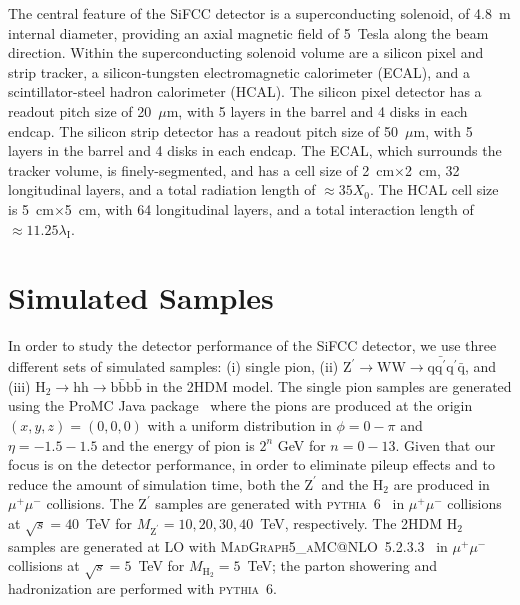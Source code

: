\documentclass{PoS}
\makeatletter
\newcommand{\PYTHIA} {{\textsc{pythia}}}
\newcommand{\MADGRAPHAMC} {\textsc{MadGraph5\_aMC@NLO}}
\makeatother
\begin{document}
The central feature of the SiFCC detector is a superconducting solenoid, 
of 4.8~m internal diameter, providing an axial magnetic field of 5~Tesla 
along the beam direction. Within the superconducting solenoid volume are 
a silicon pixel and strip tracker, a silicon-tungsten electromagnetic 
calorimeter (ECAL), and a scintillator-steel hadron calorimeter (HCAL). 
The silicon pixel detector has a readout pitch size of 20~$\mu$m, with
5 layers in the barrel and 4 disks in each endcap. 
The silicon strip detector has a readout pitch size of 50~$\mu$m, with 5 
layers in the barrel and 4 disks in each endcap.
 The ECAL, which surrounds the tracker volume, is finely-segmented, and 
 has a cell size of 2~cm$\times$2~cm, 32 longitudinal layers, and a 
total radiation length of $\approx 35 X_0$. The HCAL cell size is 
5~cm$\times$5~cm, with 64 longitudinal layers, and a total interaction 
length of $\approx 11.25 \lambda_{\mathrm I}$.

 

\section{Simulated Samples \label{sec:sample}}
In order to study the detector performance of the SiFCC detector, we use 
three different sets of simulated samples: (i) single pion, (ii) 
$\mathrm{Z}^{\prime}\rightarrow \mathrm{WW} \rightarrow \mathrm{q}\bar{\mathrm{q}^\prime}\mathrm{q^\prime}\bar{\mathrm{q}}$, and (iii) 
$\mathrm{H}_2\rightarrow \mathrm{hh} \rightarrow \mathrm{b}\bar{\mathrm{b}} \mathrm{b}\bar{\mathrm{b}}$ in the 2HDM model. 
% 
The single pion samples are generated using the ProMC Java 
package~\cite{PROMC} where the pions are 
produced at the origin $(x,y,z)=(0,0,0)$ with a uniform distribution 
in $\phi=0-\pi$ and $\eta = -1.5-1.5$ and the energy of pion is 
$2^n$ GeV for $n=0-13$. 
%
Given that our focus is on the detector performance, in order to eliminate 
pileup effects and to reduce the amount of simulation time, 
both the $\mathrm{Z}^{\prime}$ and the $\mathrm{H}_2$ are produced in 
$\mu^+\mu^-$ collisions. 
The $\mathrm{Z}^{\prime}$ samples are generated with 
\PYTHIA~6~\cite{PYTHIA} in $\mu^+\mu^-$ collisions at $\sqrt{s}=40$~TeV 
for $M_\mathrm{Z^\prime}=10,20,30,40$~TeV, respectively. 
The 2HDM $\mathrm{H}_2$ samples are generated at LO with 
\MADGRAPHAMC~5.2.3.3~\cite{MADGRAPH} in $\mu^+\mu^-$ collisions at 
$\sqrt{s}=5$~TeV for $M_\mathrm{H_2}=5$~TeV; the parton showering and 
hadronization are performed with \PYTHIA~6. 
\end{document}
